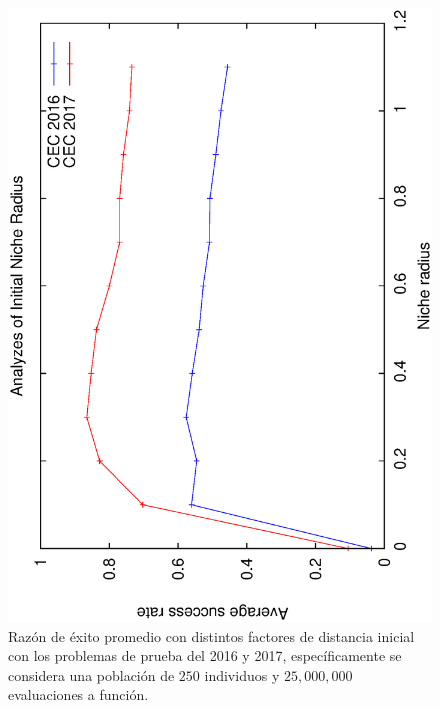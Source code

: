 %
\begin{figure}[t]
\centering
  \includegraphics[scale=0.3, angle=-90]{img/ED/Tuning_CEC.eps}
\caption{Razón de éxito promedio con distintos factores de distancia inicial con los problemas de prueba del \CEC{} 2016 y \CEC{} 2017, específicamente se considera una población de $250$ individuos y $25,000,000$ evaluaciones a función.}
\label{fig:one}
\end{figure}

